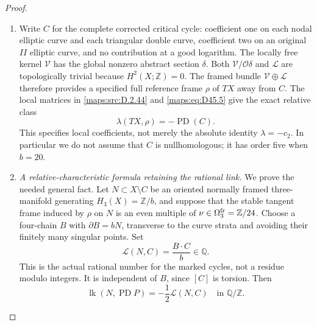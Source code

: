 \begin{proof}
\begin{enumerate}[label=\arabic*.,leftmargin=*]
\item Write $C$ for the complete corrected critical cycle: coefficient
one on each nodal elliptic curve and each triangular double
curve, coefficient two on an original $II$ elliptic curve,
and no contribution at a good logarithm. The locally free
kernel $\mathcal V$ has the global nonzero abstract section
$\delta$. Both $\mathcal V/\mathcal O\delta$ and $\mathcal L$
are topologically trivial because $H^2(X;\mathbb Z)=0$.
The framed bundle $\mathcal V\oplus\mathcal L$ therefore
provides a specified full reference frame $\rho$ of $TX$
away from $C$. The local matrices in \ref{maps:src:D.2.44} and \eqref{maps:eq:D45.5} give
the exact relative class
\[
                  \lambda(TX,\rho)=-\operatorname{PD}(C).
                                                               \tag{D45.7}\label{maps:eq:D45.7}
\]
This specifies local coefficients, not merely the absolute
identity $\lambda=-c_2$. In particular we do not assume
that $C$ is nullhomologous; it has order five when $b=20$.

\item \emph{A relative-characteristic formula retaining the rational link.}
We prove the needed general fact. Let $N\subset X\setminus C$
be an oriented normally framed three-manifold generating
$H_3(X)=\mathbb Z/b$, and suppose that the stable tangent
frame induced by $\rho$ on $N$ is an even multiple of
$\nu\in\Omega^{\rm fr}_3=\mathbb Z/24$.
Choose a four-chain $B$ with $\partial B=bN$, transverse to
the curve strata and avoiding their finitely many singular
points. Set
\[
                     \mathcal L(N,C)=\frac{B\cdot C}{b}
                             \in\mathbb Q.                  \tag{D45.8}\label{maps:eq:D45.8}
\]
This is the actual rational number for the marked cycles,
not a residue modulo integers. It is independent of $B$,
since $[C]$ is torsion. Then
\[
       \operatorname{lk}(N,\operatorname{PD}P)
                          =-\frac12\mathcal L(N,C)
                             \quad\text{in }\mathbb Q/\mathbb Z.
                                                               \tag{D45.9}\label{maps:eq:D45.9}
\]


\end{enumerate}
\end{proof}
